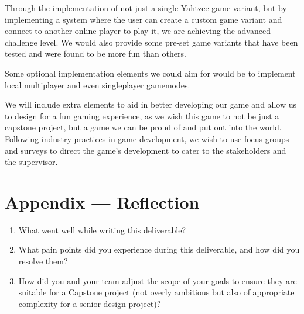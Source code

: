 \documentclass{article}
\begin{document}
\fi

Through the implementation of not just a single Yahtzee game variant, but by implementing a system where the user can create a custom game variant and connect to another online player to play it, we are achieving the advanced challenge level. We would also provide some pre-set game variants that have been tested and were found to be more fun than others.

Some optional implementation elements we could aim for would be to implement local multiplayer and even singleplayer gamemodes.

We will include extra elements to aid in better developing our game and allow us to design for a fun gaming experience, as we wish this game to not be just a capstone project, but a game we can be proud of and put out into the world. Following industry practices in game development, we wish to use focus groups and surveys to direct the game's development to cater to the stakeholders and the supervisor.

\newpage{}

\section*{Appendix --- Reflection}




\begin{enumerate}
    \item What went well while writing this deliverable? 
    \item What pain points did you experience during this deliverable, and how
    did you resolve them?
    \item How did you and your team adjust the scope of your goals to ensure
    they are suitable for a Capstone project (not overly ambitious but also of
    appropriate complexity for a senior design project)?
\end{enumerate}  
\end{document}
